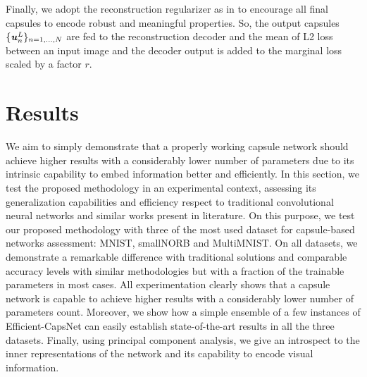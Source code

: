 \documentclass{article}
\begin{document}
Finally, we adopt the reconstruction regularizer as in \cite{sabour2017dynamic} to encourage all final capsules to encode robust and meaningful properties. So, the output capsules $\{\textbf{\textit{u}}^L_n\}_{n=1,...,N}$ are fed to the reconstruction decoder and the mean of L2 loss between an input image and the decoder output is added to the marginal loss scaled by a factor $r$.  

\section{Results}
We aim to simply demonstrate that a properly working capsule network should achieve higher results with a considerably lower number of parameters due to its intrinsic capability to embed information better and efficiently. In this section, we test the proposed methodology in an experimental context, assessing its generalization capabilities and efficiency respect to traditional convolutional neural networks and similar works present in literature. 
On this purpose, we test our proposed methodology with three of the most used dataset for capsule-based networks assessment: MNIST, smallNORB and MultiMNIST. On all datasets, we demonstrate a remarkable difference with traditional solutions and comparable accuracy levels with similar methodologies but with a fraction of the trainable parameters in most cases. All experimentation clearly shows that a capsule network is capable to achieve higher results with a considerably lower number of parameters count. Moreover, we show how a simple ensemble of a few instances of Efficient-CapsNet can easily establish state-of-the-art results in all the three datasets. Finally, using principal component analysis, we give an introspect to the inner representations of the network and its capability to encode visual information.
\end{document}

